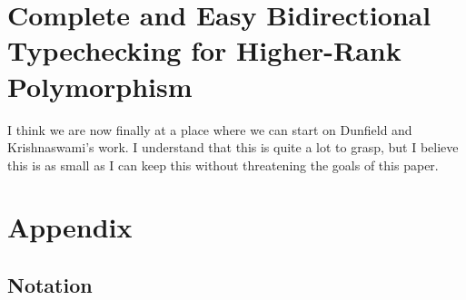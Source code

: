 \documentclass[a4paper,11pt]{article}
\begin{document}
\section{Complete and Easy Bidirectional Typechecking for Higher-Rank Polymorphism}
I think we are now finally at a place where we can start on Dunfield and Krishnaswami's work. 
I understand that this is quite a lot to grasp, but I believe this is as small as I can keep this without threatening 
the goals of this paper. 

\appendix 
\section{\bf{Appendix}}
\subsection{\bf{Notation}}
\end{document}

